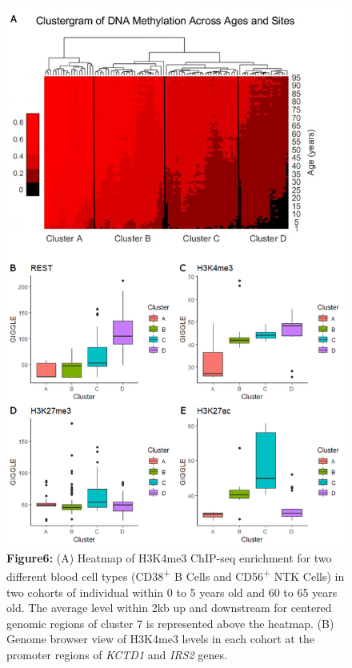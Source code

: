 \documentclass{article}
\begin{document}
{\begin{center}
    \begin{figure}
    \includegraphics[scale=.15]{Figures/Figure6.png}
    \footnotesize
    \caption*{\small \textbf{Figure6: } (A) Heatmap of H3K4me3 ChIP-seq enrichment for two different blood cell types (CD38\textsuperscript{+} B Cells and CD56\textsuperscript{+} NTK Cells) in 
two cohorts of individual within 0 to 5 years old and 60 to 65 years old. The average level within 2kb up and downstream for centered genomic regions of cluster 7 is 
represented above the heatmap. (B) Genome browser view of H3K4me3 levels in each cohort at the promoter regions of \textit{KCTD1} and \textit{IRS2} genes.  
    }
    \end{figure}
\end{center}

}
\end{document}
